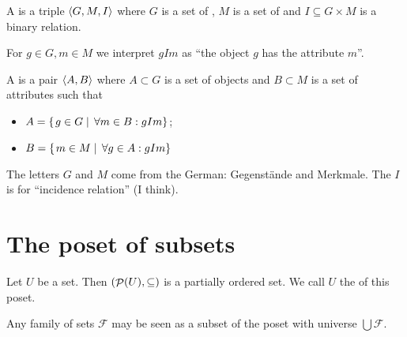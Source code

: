 \begin{definition}
A  is a triple $\langle G,M,I \rangle$ where $G$ is a set of , $M$ is a set of  and $I\subseteq G\times M$ is a binary relation.

For $g\in G, m\in M$ we interpret $gIm$ as ``the object $g$ has the attribute $m$''.



A  is a pair $\langle A,B \rangle$ where $A\subset G$ is a set of objects and $B\subset M$ is a set of attributes such that
\begin{itemize}
\item $A = \left\{\left. g\in G \;\right|\; \forall m\in B: gIm \right\}$;
\item $B = \left\{\left. m\in M \;\right|\; \forall g\in A: gIm \right\}$
\end{itemize}
\end{definition}
The letters $G$ and $M$ come from the German: Gegenstände and Merkmale. The $I$ is for ``incidence relation'' (I think).

\chapter{The poset of subsets}
\begin{definition}
Let $U$ be a set. Then $\left( \mathop{\mathcal{P}}(U), \subseteq \right)$ is a partially ordered set. We call $U$ the  of this poset.
\end{definition}

Any family of sets $\mathcal{F}$ may be seen as a subset of the poset with universe $\bigcup \mathcal{F}$.

